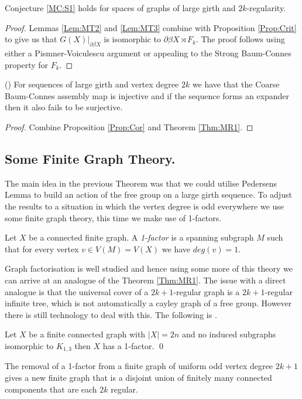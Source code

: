 \begin{conjecture}
\begin{theorem}\label{Thm:MR1}
Conjecture \ref{MC:S1} holds for spaces of graphs of large girth and $2k$-regularity.
\end{theorem}
\begin{proof}
Lemmas \ref{Lem:MT2} and \ref{Lem:MT3} combine with Proposition \ref{Prop:Crit} to give us that $G(X)|_{\partial \beta X}$ is isomorphic to $\partial \beta X \rtimes F_{k}$. The proof follows using either a Pismner-Voiculescu argument or appealing to the Strong Baum-Connes property for $F_{k}$.
\end{proof}

\begin{corollary}(\cite[Theorem 1.5]{explg1})
For sequences of large girth and vertex degree $2k$ we have that the Coarse Baum-Connes assembly map is injective and if the sequence forms an expander then it also fails to be surjective.
\end{corollary}
\begin{proof}
Combine Proposition \ref{Prop:Cor} and Theorem \ref{Thm:MR1}.
\end{proof}

\subsection{Some Finite Graph Theory.}
The main idea in the previous Theorem was that we could utilise Pedersens Lemma to build an action of the free group on a large girth sequence. To adjust the results to a situation in which the vertex degree is odd everywhere we use some finite graph theory, this time we make use of 1-factors.

\begin{definition}
Let $X$ be a connected finite graph. A \textit{1-factor} is a spanning subgraph $M$ such that for every vertex $v \in V(M)=V(X)$ we have $deg(v)=1$.
\end{definition}

Graph factorisation is well studied \cite{MR785648} and hence using some more of this theory we can arrive at an analogue of the Theorem \ref{Thm:MR1}. The issue with a direct analogue is that the universal cover of a $2k+1$-regular graph is a $2k+1$-regular infinite tree, which is not automatically a cayley graph of a free group. However there is still technology to deal with this. The following is \cite[Corollary 2]{MR0323648}.

\begin{proposition}
Let $X$ be a finite connected graph with $\vert X \vert = 2n$ and no induced subgraphs isomorphic to $K_{1,3}$ then $X$ has a 1-factor. \qed
\end{proposition}
The removal of a 1-factor from a finite graph of uniform odd vertex degree $2k+1$ gives a new finite graph that is a disjoint union of finitely many connected components that are each $2k$ regular.


\end{conjecture}
